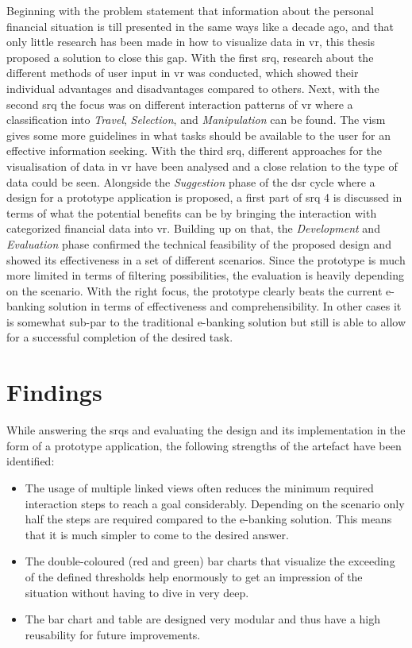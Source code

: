 Beginning with the problem statement that information about the personal financial situation is till presented in the same ways like a decade ago, and that only little research has been made in how to visualize data in \gls{vr}, this thesis proposed a solution to close this gap. With the first \gls{srq}, research about the different methods of user input in \gls{vr} was conducted, which showed their individual advantages and disadvantages compared to others. Next, with the second \gls{srq} the focus was on different interaction patterns of \gls{vr} where a classification into \textit{Travel}, \textit{Selection}, and \textit{Manipulation} can be found. The \gls{vism} gives some more guidelines in what tasks should be available to the user for an effective information seeking. With the third \gls{srq}, different approaches for the visualisation of data in \gls{vr} have been analysed and a close relation to the type of data could be seen. Alongside the \textit{Suggestion} phase of the \gls{dsr} cycle where a design for a prototype application is proposed, a first part of \gls{srq} 4 is discussed in terms of what the potential benefits can be by bringing the interaction with categorized financial data into \gls{vr}. Building up on that, the \textit{Development} and \textit{Evaluation} phase confirmed the technical feasibility of the proposed design and showed its effectiveness in a set of different scenarios. Since the prototype is much more limited in terms of filtering possibilities, the evaluation is heavily depending on the scenario. With the right focus, the prototype clearly beats the current e-banking solution in terms of effectiveness and comprehensibility. In other cases it is somewhat sub-par to the traditional e-banking solution but still is able to allow for a successful completion of the desired task.



\section{Findings}

While answering the \glspl{srq} and evaluating the design and its implementation in the form of a prototype application, the following strengths of the artefact have been identified:
\begin{itemize}[]
	\item The usage of multiple linked views often reduces the minimum required interaction steps to reach a goal considerably. Depending on the scenario only half the steps are required compared to the e-banking solution. This means that it is much simpler to come to the desired answer.
	\item The double-coloured (red and green) bar charts that visualize the exceeding of the defined thresholds help enormously to get an impression of the situation without having to dive in very deep.
	\item The bar chart and table are designed very modular and thus have a high reusability for future improvements.
\end{itemize}

